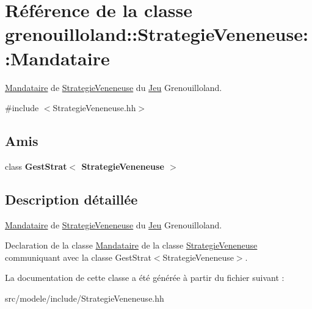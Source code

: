 \hypertarget{classgrenouilloland_1_1StrategieVeneneuse_1_1Mandataire}{\section{Référence de la classe grenouilloland\-:\-:Strategie\-Veneneuse\-:\-:Mandataire}
\label{classgrenouilloland_1_1StrategieVeneneuse_1_1Mandataire}
}


\hyperlink{classgrenouilloland_1_1StrategieVeneneuse_1_1Mandataire}{Mandataire} de \hyperlink{classgrenouilloland_1_1StrategieVeneneuse}{Strategie\-Veneneuse} du \hyperlink{classgrenouilloland_1_1Jeu}{Jeu} Grenouilloland.  




{\ttfamily \#include $<$Strategie\-Veneneuse.\-hh$>$}

\subsection*{Amis}
\begin{DoxyCompactItemize}
\item 
\hypertarget{classgrenouilloland_1_1StrategieVeneneuse_1_1Mandataire_a346ba4f9ffe916c32d356e4e70c7ca1f}{class {\bfseries Gest\-Strat$<$ Strategie\-Veneneuse $>$}}\label{classgrenouilloland_1_1StrategieVeneneuse_1_1Mandataire_a346ba4f9ffe916c32d356e4e70c7ca1f}

\end{DoxyCompactItemize}


\subsection{Description détaillée}
\hyperlink{classgrenouilloland_1_1StrategieVeneneuse_1_1Mandataire}{Mandataire} de \hyperlink{classgrenouilloland_1_1StrategieVeneneuse}{Strategie\-Veneneuse} du \hyperlink{classgrenouilloland_1_1Jeu}{Jeu} Grenouilloland. 

Declaration de la classe \hyperlink{classgrenouilloland_1_1StrategieVeneneuse_1_1Mandataire}{Mandataire} de la classe \hyperlink{classgrenouilloland_1_1StrategieVeneneuse}{Strategie\-Veneneuse} communiquant avec la classe Gest\-Strat$<$\-Strategie\-Veneneuse$>$. 

La documentation de cette classe a été générée à partir du fichier suivant \-:\begin{DoxyCompactItemize}
\item 
src/modele/include/Strategie\-Veneneuse.\-hh\end{DoxyCompactItemize}
